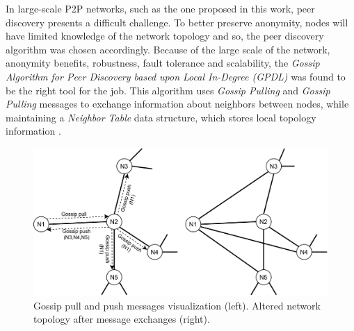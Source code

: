 In large-scale P2P networks, such as the one proposed in this work, peer 
discovery presents a difficult challenge. To better preserve anonymity, nodes 
will have limited knowledge of the network topology and so, the peer discovery 
algorithm was chosen accordingly. Because of the large scale of the network, 
anonymity benefits, robustness, fault tolerance and scalability, the 
\textit{Gossip Algorithm for Peer Discovery based upon Local In-Degree (GPDL)} 
was found to be the right tool for the job. This algorithm uses \textit{Gossip 
Pulling} and \textit{Gossip Pulling} messages to exchange information about 
neighbors between nodes, while maintaining a \textit{Neighbor Table} data 
structure, which stores local topology information \cite{peerdiscovery}.

\begin{figure}
    \centering
    \includegraphics[width=\textwidth]{figures/fig1}
    \caption{Gossip pull and push messages visualization (left). Altered 
network topology after message exchanges (right).}
    \label{fig:fig1}
\end{figure}

